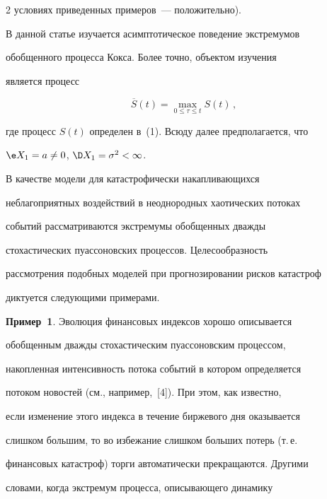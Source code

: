 \begin{multicols}{2}
условиях приведенных примеров~--- положительно).





В данной статье изучается асимптотическое поведение экстремумов


обобщенного процесса Кокса. Более точно, объектом изучения


является процесс


$$


\overline{S}(t) = \max_{0\leq\tau\leq t} S(t)\,,


$$


где процесс $S(t)$ определен в~(1). Всюду далее предполагается, что


$\e X_1 = a \neq 0$, $\D X_1 = \sigma^2 < \infty$.





В качестве модели для катастрофически накапливающихся


неблагоприятных воздействий в неоднородных хаотических потоках


событий рас\-смат\-ри\-ва\-ют\-ся экстремумы обобщенных дважды\linebreak


стохастических пуассоновских процессов. Целесообразность


рассмотрения подобных моделей при прогнозировании рисков катастроф


диктуется следующими примерами.





\smallskip





\noindent


\textbf{Пример~1}. Эволюция финансовых индексов хорошо описывается


обобщенным дважды стохастическим пуассоновским процессом,


накопленная интенсивность потока событий в котором определяется


потоком новостей (см., например,~[4]). При этом, как известно,


если изменение этого индекса в течение биржевого дня оказывается


слишком большим, то во избежание слишком больших потерь (т.\,е.\


финансовых катастроф) торги автоматически прекращаются. Другими


словами, когда экстремум процесса, описывающего динамику



\end{multicols}
